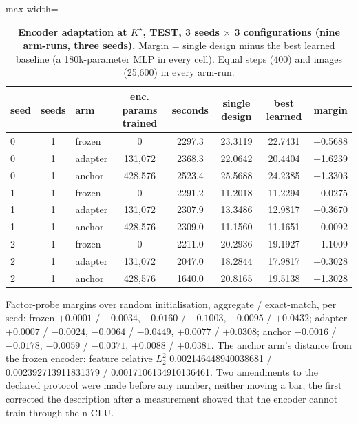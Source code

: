 \documentclass{article} %
\newcommand{\Kstar}{\ensuremath{K^{\star}}}
\begin{document}
\begin{table}[h]
\centering\small
\caption{\textbf{Encoder adaptation at $\Kstar$, TEST, 3 seeds $\times$ 3 configurations (nine
arm-runs, three seeds).} Margin = single design minus the best learned baseline (a 180k-parameter %
MLP in every cell). Equal steps (400) and images (25,600) in every arm-run.} %
\label{tab:adapt}
\setlength{\tabcolsep}{3pt}
\begin{adjustbox}{max width=\linewidth}\begin{tabular}{lclccccc}
\toprule
seed & seeds & arm & enc. params trained & seconds & single design & best learned & margin \\
\midrule
0 & 1 & frozen & 0 & 2297.3 & 23.3119 & 22.7431 & +0.5688 \\
0 & 1 & adapter & 131,072 & 2368.3 & 22.0642 & 20.4404 & +1.6239 \\
0 & 1 & anchor & 428,576 & 2523.4 & 25.5688 & 24.2385 & +1.3303 \\
1 & 1 & frozen & 0 & 2291.2 & 11.2018 & 11.2294 & $-0.0275$ \\
1 & 1 & adapter & 131,072 & 2307.9 & 13.3486 & 12.9817 & +0.3670 \\
1 & 1 & anchor & 428,576 & 2309.0 & 11.1560 & 11.1651 & $-0.0092$ \\
2 & 1 & frozen & 0 & 2211.0 & 20.2936 & 19.1927 & +1.1009 \\
2 & 1 & adapter & 131,072 & 2047.0 & 18.2844 & 17.9817 & +0.3028 \\
2 & 1 & anchor & 428,576 & 1640.0 & 20.8165 & 19.5138 & +1.3028 \\
\bottomrule
\end{tabular}\end{adjustbox}
\end{table}

\noindent Factor-probe margins over random initialisation, aggregate / exact-match, per seed:
frozen $+0.0001$ / $-0.0034$, $-0.0160$ / $-0.1003$, $+0.0095$ / $+0.0432$; adapter
$+0.0007$ / $-0.0024$, $-0.0064$ / $-0.0449$, $+0.0077$ / $+0.0308$; anchor $-0.0016$ / $-0.0178$,
$-0.0059$ / $-0.0371$, $+0.0088$ / $+0.0381$. The anchor arm's distance from the frozen encoder:
feature relative $L_2^2$ 0.002146448940038681 / 0.002392713911831379 /
0.0017106134910136461. %
Two amendments to the declared protocol were made before any number, neither moving a bar; the first
corrected the description after a measurement showed that the encoder cannot train through the
n-CLU. %
\end{document}
